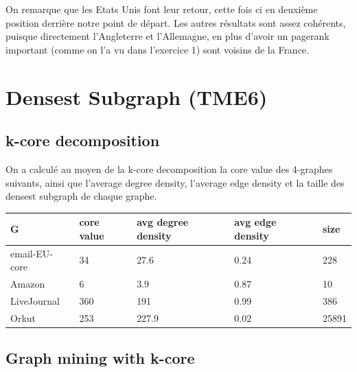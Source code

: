 \documentclass{report}
\begin{document}
On remarque que les Etats Unis font leur retour, cette fois ci en deuxième position derrière notre point de départ. Les autres résultats sont assez cohérents, puisque directement l'Angleterre et l'Allemagne, en plus d'avoir un pagerank important (comme on l'a vu dans l'exercice 1) sont voisins de la France.

\chapter{Densest Subgraph (TME6)}

\section{k-core decomposition}

On a calculé au moyen de la k-core decomposition la core value des 4-graphes suivants, ainsi que l'average degree density, l'average edge density et la taille des densest subgraph de chaque graphe.
\begin{center}
  \begin{tabular}{|l|l|l|l|l|}
    \hline
    G & core value & avg degree density & avg edge density & size\\
    \hline
    email-EU-core & 34 & 27.6 & 0.24 & 228\\
    Amazon & 6 & 3.9 & 0.87 & 10\\
    LiveJournal & 360 & 191 & 0.99 & 386\\
    Orkut & 253 & 227.9 & 0.02 & 25891 \\
    \hline
  \end{tabular}
\end{center}

\section{Graph mining with k-core}
\end{document}
